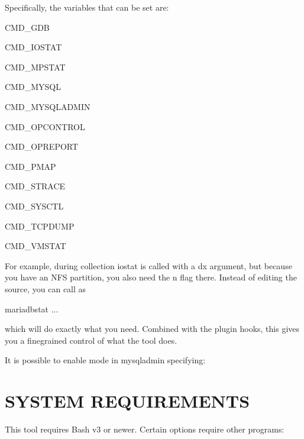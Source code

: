 \documentclass[letterpaper,10pt,english]{sphinxmanual}
\begin{document}
\sphinxAtStartPar
Specifically, the variables that can be set are:

\sphinxAtStartPar
CMD\_GDB

\sphinxAtStartPar
CMD\_IOSTAT

\sphinxAtStartPar
CMD\_MPSTAT

\sphinxAtStartPar
CMD\_MYSQL

\sphinxAtStartPar
CMD\_MYSQLADMIN

\sphinxAtStartPar
CMD\_OPCONTROL

\sphinxAtStartPar
CMD\_OPREPORT

\sphinxAtStartPar
CMD\_PMAP

\sphinxAtStartPar
CMD\_STRACE

\sphinxAtStartPar
CMD\_SYSCTL

\sphinxAtStartPar
CMD\_TCPDUMP

\sphinxAtStartPar
CMD\_VMSTAT

\sphinxAtStartPar
For example, during collection iostat is called with a \sphinxhyphen{}dx argument, but
because you have an NFS partition, you also need the \sphinxhyphen{}n flag there.  Instead
of editing the source, you can call  as

\begin{sphinxVerbatim}[commandchars=\\\{\}]
 mariadb\PYGZhy{}stat ...
\end{sphinxVerbatim}

\sphinxAtStartPar
which will do exactly what you need.  Combined with the plugin hooks, this
gives you a fine\sphinxhyphen{}grained control of what the tool does.

\sphinxAtStartPar
It is possible to enable  mode in mysqladmin specifying:

\sphinxAtStartPar
{}


\section{SYSTEM REQUIREMENTS}
\label{\detokenize{mariadb-stat:system-requirements}}
\sphinxAtStartPar
This tool requires Bash v3 or newer.  Certain options require other programs:
\end{document}
